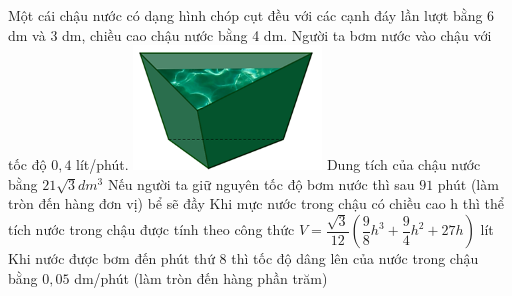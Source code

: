 \begin{ex}%
\immini
{
    Một cái chậu nước có dạng hình chóp cụt đều với các cạnh đáy lần lượt bằng 6 dm và 3 dm, chiều cao chậu nước bằng 4 dm. Người ta bơm nước vào chậu với tốc độ $0{,}4$ lít/phút.
}
{
    \includegraphics[width=5cm]{img/HXN-10-14}
}
    \choiceTF
    {\True Dung tích của chậu nước bằng $ 21\sqrt{3}d{m^3}$}
    {Nếu người ta giữ nguyên tốc độ bơm nước thì sau $91$ phút (làm tròn đến hàng đơn vị) bể sẽ đầy}
    {Khi mực nước trong chậu có chiều cao h thì thể tích nước trong chậu được tính theo công thức $ V=\dfrac{\sqrt{3}}{12}\left(\dfrac{9}{8}{h^3}+\dfrac{9}{4}{h^2}+27h\right)$ lít}
    {Khi nước được bơm đến phút thứ 8 thì tốc độ dâng lên của nước trong chậu bằng $0{,}05$ dm/phút (làm tròn đến hàng phần trăm)}
\end{ex}
